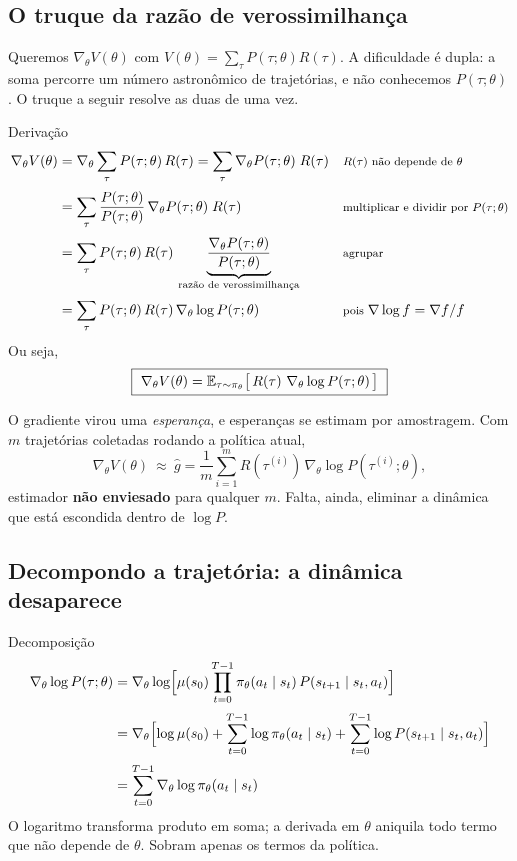 \documentclass[11pt]{article}
\newcommand{\thv}{\theta}
\newcommand{\polth}{\pol_{\thv}}
\newcommand{\gth}{\nabla_{\thv}}
\newcommand{\traj}{\tau}
\newcommand{\Rtraj}{R(\traj)}
\newcommand{\Ptraj}{P(\traj;\thv)}
\begin{document}
\subsection{O truque da razão de verossimilhança}

Queremos $\gth V(\thv)$ com $V(\thv)=\sum_{\traj}\Ptraj\Rtraj$. A dificuldade é
dupla: a soma percorre um número astronômico de trajetórias, e não conhecemos
$\Ptraj$. O truque a seguir resolve as duas de uma vez.

\begin{teobox}{Derivação}
{\small
\begin{align*}
  \gth V(\thv)
    &= \gth \sum_{\traj}\Ptraj\,\Rtraj
     = \sum_{\traj}\gth \Ptraj\; \Rtraj
      && \text{\footnotesize $\Rtraj$ não depende de $\thv$}\\[0.2em]
    &= \sum_{\traj}\frac{\Ptraj}{\Ptraj}\,\gth \Ptraj\;\Rtraj
      && \text{\footnotesize multiplicar e dividir por $\Ptraj$}\\[0.2em]
    &= \sum_{\traj}\Ptraj\,\Rtraj\,
       \underbrace{\frac{\gth \Ptraj}{\Ptraj}}_{\text{razão de verossimilhança}}
      && \text{\footnotesize agrupar}\\[0.2em]
    &= \sum_{\traj}\Ptraj\,\Rtraj\,\gth\log\Ptraj
      && \text{\footnotesize pois } \nabla\log f = \nabla f / f
\end{align*}}
Ou seja,
\[
  \boxed{\ \gth V(\thv) = \E_{\traj\sim\polth}\bigl[\,\Rtraj\ \gth\log\Ptraj\,\bigr]\ }
\]
\end{teobox}

O gradiente virou uma \emph{esperança}, e esperanças se estimam por amostragem.
Com $m$ trajetórias coletadas rodando a política atual,
\[
  \gth V(\thv)\ \approx\ \hat g
   = \frac{1}{m}\sum_{i=1}^{m} R(\traj^{(i)})\,\gth\log P(\traj^{(i)};\thv),
\]
estimador \textbf{não enviesado} para qualquer $m$. Falta, ainda, eliminar a
dinâmica que está escondida dentro de $\log P$.

\subsection{Decompondo a trajetória: a dinâmica desaparece}

\begin{teobox}{Decomposição}
\begin{align*}
  \gth\log P(\traj;\thv)
   &= \gth\log\Bigl[\mu(s_0)\prod_{t=0}^{T-1}\polth(a_t\mid s_t)\,
      \tran{s_{t+1}}{s_t,a_t}\Bigr]\\[0.2em]
   &= \gth\Bigl[\log\mu(s_0) + \sum_{t=0}^{T-1}\log\polth(a_t\mid s_t)
      + \sum_{t=0}^{T-1}\log \tran{s_{t+1}}{s_t,a_t}\Bigr]\\[0.2em]
   &= \sum_{t=0}^{T-1}\gth\log\polth(a_t\mid s_t)
\end{align*}
O logaritmo transforma produto em soma; a derivada em $\thv$ aniquila todo termo
que não depende de $\thv$. Sobram apenas os termos da política.
\end{teobox}
\end{document}
